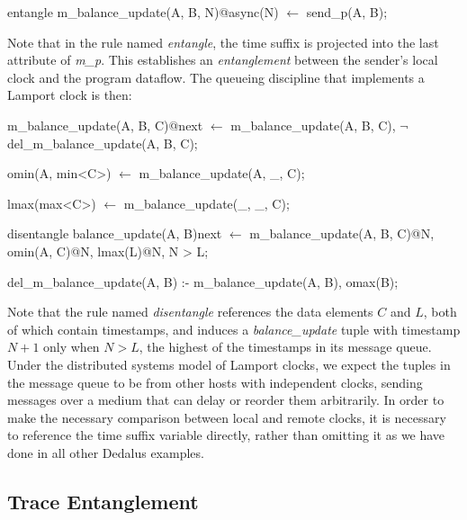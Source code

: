 \begin{Dedalus}
entangle
m\_balance\_update(A, B, N)@async(N) \(\leftarrow\)
  send\_p(A, B);
\end{Dedalus}

Note that in the rule named \emph{entangle}, the time suffix is projected into the last attribute of \emph{m\_p}.  
This establishes an \emph{entanglement} between
the sender's local clock and the program dataflow.  The queueing discipline that implements a
Lamport clock is then:

\begin{Dedalus}

m\_balance\_update(A, B, C)@next \(\leftarrow\)
  m\_balance\_update(A, B, C),
  \(\lnot\) del\_m\_balance\_update(A, B, C);

omin(A, min<C>) \(\leftarrow\)
  m\_balance\_update(A, _, C);

lmax(max<C>) \(\leftarrow\)
  m\_balance\_update(_, _, C);

disentangle
balance_update(A, B)next \(\leftarrow\)
  m\_balance\_update(A, B, C)@N,
  omin(A, C)@N,
  lmax(L)@N,
  N > L;

del\_m\_balance\_update(A, B) :-
  m\_balance\_update(A, B),
  omax(B);
  
\end{Dedalus}

Note that the rule named \emph{disentangle} references the data elements $C$ and $L$, both of which
contain timestamps, and induces a \emph{balance\_update} tuple with timestamp $N+1$ only when $N > L$,
the highest of the timestamps in its message queue.  Under the distributed systems model of Lamport clocks, 
we expect the tuples in the message queue to  be from other hosts with independent clocks, sending messages 
over a medium that can delay or reorder them arbitrarily.  In order to make the necessary comparison between local
and remote clocks, it is necessary to reference the time suffix variable directly, rather than omitting it as we have done 
in all other Dedalus examples.

\subsection{Trace Entanglement}

